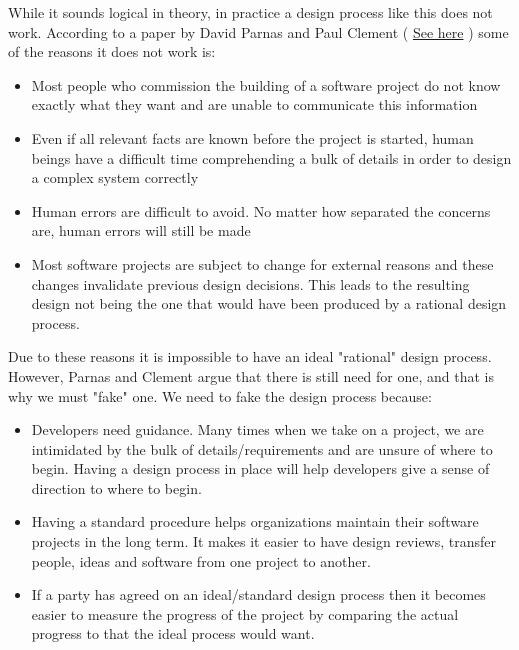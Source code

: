 \documentclass[12pt]{article}
\begin{document}
\begin{enumerate}[(a)]
\begin{itemize}
\end{itemize}

While it sounds logical in theory, in practice a design process like this does not work. According to a paper by David Parnas and Paul Clement ( \href{https://www.researchgate.net/publication/260649064_A_Rational_Design_Process_How_and_Why_to_Fake_i}{See here} ) some of the reasons it does not 
work is:
\begin{itemize}[(a)]

\item Most people who commission the building of a software project do not know exactly what they want and are unable to communicate this information

\item Even if all relevant facts are known before the project is started, human beings have a difficult time comprehending a bulk of details in order to design a complex system correctly

\item Human errors are difficult to avoid. No matter how separated the concerns are, human errors will still be made

\item Most software projects are subject to change for external reasons and these changes invalidate previous design decisions. This leads to the resulting design not being the one that would have been produced by a rational design process.
\end{itemize}

Due to these reasons it is impossible to have an ideal "rational" design process. However, Parnas and Clement argue that there is still need for one, and that is why we must "fake" one. We need to fake the design process because:

\begin{itemize}[(a)]

\item Developers need guidance. Many times when we take on a project, we are intimidated by the bulk of details/requirements and are unsure of where to begin. Having a design process in place will help developers give a sense of direction to where to begin.

\item Having a standard procedure helps organizations maintain their software projects in the long term. It makes it easier to have design reviews, transfer people, ideas and software from one project to another. 

\item If a party has agreed on an ideal/standard design process then it becomes easier to measure the progress of the project by comparing the actual progress to that the ideal process would want. 


\end{itemize}
\end{enumerate}
\end{document}
